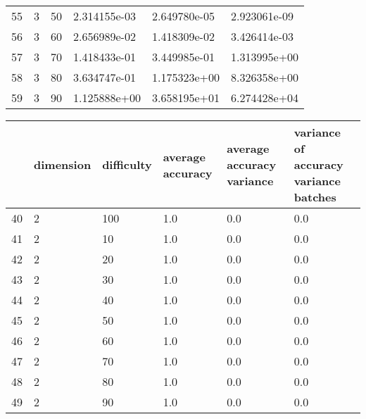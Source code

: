\documentclass{article}
\begin{document}
\begin{center}
\begin{tabular}{llllll}
55 &         3 &         50 &  2.314155e-03 &          2.649780e-05 &                      2.923061e-09 \\
56 &         3 &         60 &  2.656989e-02 &          1.418309e-02 &                      3.426414e-03 \\
57 &         3 &         70 &  1.418433e-01 &          3.449985e-01 &                      1.313995e+00 \\
58 &         3 &         80 &  3.634747e-01 &          1.175323e+00 &                      8.326358e+00 \\
59 &         3 &         90 &  1.125888e+00 &          3.658195e+01 &                      6.274428e+04 \\
\bottomrule
\end{tabular}
\end{center}
\begin{center}
\begin{tabular}{llllll}
\toprule
{} & dimension & difficulty & average accuracy & average accuracy variance & variance of accuracy variance batches \\
\midrule
40 &         2 &        100 &              1.0 &                       0.0 &                                   0.0 \\
41 &         2 &         10 &              1.0 &                       0.0 &                                   0.0 \\
42 &         2 &         20 &              1.0 &                       0.0 &                                   0.0 \\
43 &         2 &         30 &              1.0 &                       0.0 &                                   0.0 \\
44 &         2 &         40 &              1.0 &                       0.0 &                                   0.0 \\
45 &         2 &         50 &              1.0 &                       0.0 &                                   0.0 \\
46 &         2 &         60 &              1.0 &                       0.0 &                                   0.0 \\
47 &         2 &         70 &              1.0 &                       0.0 &                                   0.0 \\
48 &         2 &         80 &              1.0 &                       0.0 &                                   0.0 \\
49 &         2 &         90 &              1.0 &                       0.0 &                                   0.0 \\

\end{tabular}
\end{center}
\end{document}
